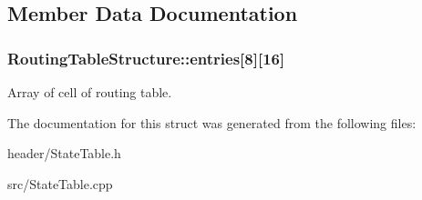 \subsection{Member Data Documentation}
\hypertarget{structRoutingTableStructure_ab03108d6d78ffa4fa5a66f2d1d110c6d}{
\subsubsection[{entries}]{ Routing\-Table\-Structure\-::entries\mbox{[}8\mbox{]}\mbox{[}16\mbox{]}}}\label{structRoutingTableStructure_ab03108d6d78ffa4fa5a66f2d1d110c6d}
Array of cell of routing table. 

The documentation for this struct was generated from the following files\-:\begin{DoxyCompactItemize}
\item 
header/State\-Table.\-h\item 
src/State\-Table.\-cpp\end{DoxyCompactItemize}

